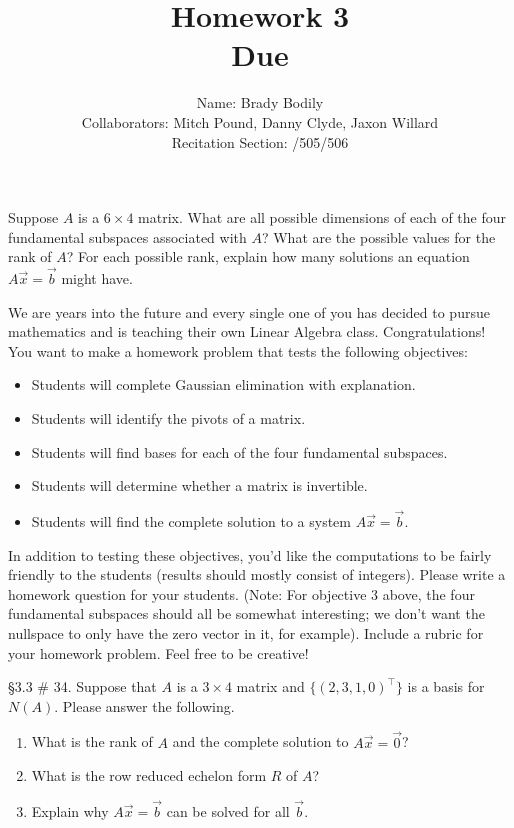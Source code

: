 \documentclass[]{exam}
\title{Homework 3\\
	Due \DTMdate{2020-03-13} %
	}
\date{ %
	}
\author{Name: Brady Bodily  \\
		\footnotesize Collaborators: Mitch Pound, Danny Clyde, Jaxon Willard  \\
		\footnotesize Recitation Section: \circled{504} /505/506
		}
\begin{document}
\maketitle

\printanswers %

\begin{questions}
	\question Suppose $A$ is a $6 \times 4$ matrix. What are all possible dimensions of each of the four fundamental subspaces associated with $A$?
	What are the possible values for the rank of $A$? 
	For each possible rank, explain how many solutions an equation $A\vec{x}=\vec{b}$ might have.
	
	\begin{solution}
	
	\end{solution}
	
	\question We are years into the future and every single one of you has decided to pursue mathematics and is teaching their own Linear Algebra class. Congratulations! You want to make a homework problem that tests the following objectives:
	\begin{itemize}
		\item Students will complete Gaussian elimination with explanation.
		\item Students will identify the pivots of a matrix.
		\item Students will find bases for each of the four fundamental subspaces.
		\item Students will determine whether a matrix is invertible.
		\item Students will find the complete solution to a system $A\vec{x}=\vec{b}$.
	\end{itemize}
	In addition to testing these objectives, you'd like the computations to be fairly friendly to the students (results should mostly consist of integers). Please write a homework question for your students. (Note: For objective 3 above, the four fundamental subspaces should all be somewhat interesting; we don't want the nullspace to only have the zero vector in it, for example). Include a rubric for your homework problem. Feel free to be creative!
	
	\begin{solution}
	
	\end{solution}
	
	\question \S 3.3 \# 34. Suppose that $A$ is a $3 \times 4$ matrix and $\{(2,3,1,0)^\intercal\}$ is a basis for $N(A)$. Please answer the following.
	\begin{enumerate}[label=(\alph*)]
		\item What is the rank of $A$ and the complete solution to $A\vec{x}=\vec{0}$?
		\item What is the row reduced echelon form $R$ of $A$?
		\item Explain why $A\vec{x}=\vec{b}$ can be solved for all $\vec{b}$.
	\end{enumerate}
	

\end{questions}
\end{document}
